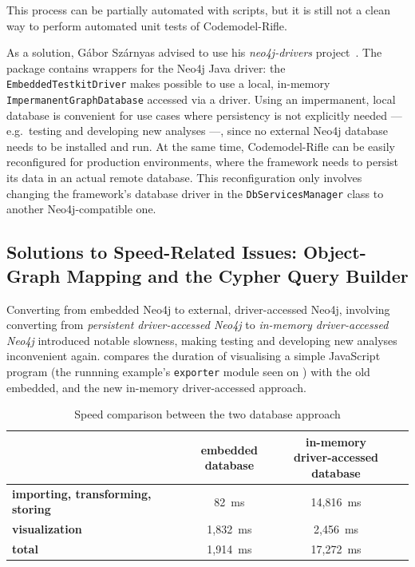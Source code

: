 This process can be partially automated with scripts, but it is still not a clean way to perform automated unit tests of Codemodel-Rifle.

As a solution, Gábor Szárnyas advised to use his \emph{neo4j-drivers} project~\cite{neo4j-drivers}. The package contains wrappers for the Neo4j Java driver: the \lstinline{EmbeddedTestkitDriver} makes possible to use a local, in-memory \lstinline{ImpermanentGraphDatabase} accessed via a driver. Using an impermanent, local database is convenient for use cases where persistency is not explicitly needed — e.g.\ testing and developing new analyses —, since no external Neo4j database needs to be installed and run. At the same time, Codemodel-Rifle can be easily reconfigured for production environments, where the framework needs to persist its data in an actual remote database. This reconfiguration only involves changing the framework's database driver in the \lstinline{DbServicesManager} class to another Neo4j-compatible one.


\subsection[Solutions to Speed-Related Issues]{Solutions to Speed-Related Issues: Object-Graph Mapping and the Cypher Query Builder}

Converting from embedded Neo4j to external, driver-accessed Neo4j, involving converting from \emph{persistent driver-accessed Neo4j} to \emph{in-memory driver-accessed Neo4j} introduced notable slowness, making testing and developing new analyses inconvenient again.  compares the duration of visualising a simple JavaScript program (the runnning example's \lstinline{exporter} module seen on ) with the old embedded, and the new in-memory driver-accessed approach.

\vspace*{-1mm}
\begin{table}[!htb]
	\centering
	\begin{tabular}{l|cc}
		\toprule
																								& \shortstack{\textbf{embedded} \\ \textbf{database}}
																								& \shortstack{\textbf{in-memory} \\ \textbf{driver-accessed database}}
																								\\
		\midrule
		\textbf{importing, transforming, storing}   &   82~ms      &   14,816~ms   \\
		\textbf{visualization}                      &   1,832~ms   &   2,456~ms    \\
		\midrule
		\textbf{total}                              &   1,914~ms   &   17,272~ms   \\
		\bottomrule
	\end{tabular}

	\caption[Speed comparison between the two database approach]{Speed comparison between the two database approach\footnotemark}
	\label{table:embedded-vs-in-memory-remote-table}
\end{table}

